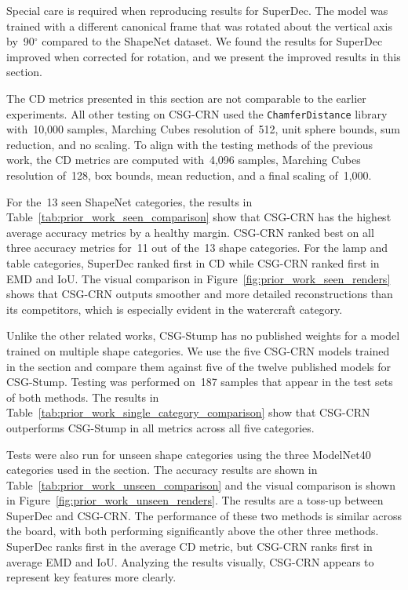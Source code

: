 Special care is required when reproducing results for SuperDec. The model was trained with a different canonical frame that was rotated about the vertical axis by~90$^\circ$ compared to the ShapeNet dataset. We found the results for SuperDec improved when corrected for rotation, and we present the improved results in this section.

The CD metrics presented in this section are not comparable to the earlier experiments. All other testing on CSG-CRN used the \texttt{ChamferDistance} library~\cite{Jatavallabhula2024, Ravi2020} with~10,000 samples, Marching Cubes resolution of~512, unit sphere bounds, sum reduction, and no scaling. To align with the testing methods of the previous work, the CD metrics are computed with~4,096 samples, Marching Cubes resolution of~128, box bounds, mean reduction, and a final scaling of~1,000.

For the~13 seen ShapeNet categories, the results in Table~\ref{tab:prior_work_seen_comparison} show that CSG-CRN has the highest average accuracy metrics by a healthy margin. CSG-CRN ranked best on all three accuracy metrics for~11 out of the~13 shape categories. For the lamp and table categories, SuperDec ranked first in CD while CSG-CRN ranked first in EMD and IoU. The visual comparison in Figure~\ref{fig:prior_work_seen_renders} shows that CSG-CRN outputs smoother and more detailed reconstructions than its competitors, which is especially evident in the watercraft category.

Unlike the other related works, CSG-Stump has no published weights for a model trained on multiple shape categories. We use the five CSG-CRN models trained in the  section and compare them against five of the twelve published models for CSG-Stump. Testing was performed on~187 samples that appear in the test sets of both methods. The results in Table~\ref{tab:prior_work_single_category_comparison} show that CSG-CRN outperforms CSG-Stump in all metrics across all five categories.

Tests were also run for unseen shape categories using the three ModelNet40 categories used in the  section. The accuracy results are shown in Table~\ref{tab:prior_work_unseen_comparison} and the visual comparison is shown in Figure~\ref{fig:prior_work_unseen_renders}. The results are a toss-up between SuperDec and CSG-CRN. The performance of these two methods is similar across the board, with both performing significantly above the other three methods. SuperDec ranks first in the average CD metric, but CSG-CRN ranks first in average EMD and IoU. Analyzing the results visually, CSG-CRN appears to represent key features more clearly.

